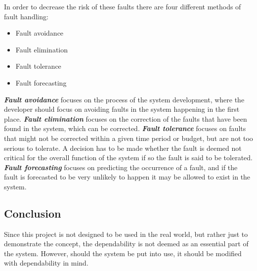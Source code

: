 In order to decrease the risk of these faults there are four different methods of fault handling:
\begin{itemize}
\item Fault avoidance
\item Fault elimination
\item Fault tolerance
\item Fault forecasting
\end{itemize}
\textit{\textbf{Fault avoidance}} focuses on the process of the system development, where the developer should focus on avoiding faults in the system happening in the first place.
\textit{\textbf{Fault elimination}} focuses on the correction of the faults that have been found in the system, which can be corrected. 
\textit{\textbf{Fault tolerance}} focuses on faults that might not be corrected within a given time period or budget, but are not too serious to tolerate.
A decision has to be made whether the fault is deemed not critical for the overall function of the system if so the fault is said to be tolerated.
\textit{\textbf{Fault forecasting}} focuses on predicting the occurrence of a fault, and if the fault is forecasted to be very unlikely to happen it may be allowed to exist in the system. 

\subsection{Conclusion}
Since this project is not designed to be used in the real world, but rather just to demonstrate the concept, the dependability is not deemed as an essential part of the system. 
However, should the system be put into use, it should be modified with dependability in mind. 
